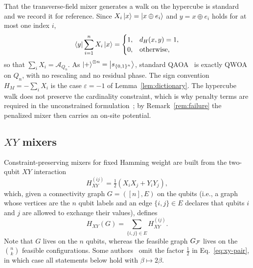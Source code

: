 That the transverse-field mixer generates a walk on the hypercube is standard~\cite{Marsh2019,Marsh2020,Slate2021,Matwiejew2024} and we record it for reference. Since $X_i\ket{x}=\ket{x\oplus e_i}$ and $y=x\oplus e_i$ holds for at most one index $i$,
\begin{equation}
    \bra{y}\sum_{i=1}^{n}X_i\ket{x}
    =
    \begin{cases}
        1, & d_H(x,y)=1,\\
        0, & \text{otherwise},
    \end{cases}
    \label{eq:hypercube}
\end{equation}
so that $\sum_i X_i=\mathcal{A}_{Q_n}$. As $\ket{+}^{\otimes n}=\ket{s_{\{0,1\}^n}}$, standard QAOA~\cite{Farhi2014} is exactly QWOA on $Q_n$, with no rescaling and no residual phase. The sign convention $H_M=-\sum_i X_i$ is the case $\varepsilon=-1$ of Lemma~\ref{lem:dictionary}. The hypercube walk does not preserve the cardinality constraint, which is why penalty terms are required in the unconstrained formulation~\cite{Lucas2014,Hodson2019}; by Remark~\ref{rem:failure} the penalized mixer then carries an on-site potential.

\subsection{\label{subsec:xy}$XY$ mixers}

Constraint-preserving mixers for fixed Hamming weight are built from the two-qubit $XY$ interaction~\cite{Wang2020}
\begin{equation}
    H^{(ij)}_{XY}
    =
    \tfrac{1}{2}\left(X_iX_j+Y_iY_j\right),
    \label{eq:xy-pair}
\end{equation}
which, given a connectivity graph $G=([n],E)$ on the qubits (i.e., a graph whose vertices are the $n$ qubit labels and an edge $\{i,j\}\in E$ declares that qubits $i$ and $j$ are allowed to exchange their values), defines
\begin{equation}
    H_{XY}(G)
    =
    \sum_{\{i,j\}\in E}
    H^{(ij)}_{XY} .
    \label{eq:xy-mixer}
\end{equation}
Note that $G$ lives on the $n$ qubits, whereas the feasible graph $G_{\mathcal{F}}$ lives on the $\binom{n}{k}$ feasible configurations. Some authors~\cite{Wang2020,Matwiejew2024} omit the factor $\tfrac12$ in Eq.~\eqref{eq:xy-pair}, in which case all statements below hold with $\beta\mapsto2\beta$.

